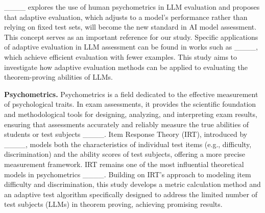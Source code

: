 ____ explores the use of human psychometrics in LLM evaluation and proposes that adaptive evaluation, which adjusts to a model’s performance rather than relying on fixed test sets, will become the new standard in AI model assessment. This concept serves as an important reference for our study. Specific applications of adaptive evaluation in LLM assessment can be found in works such as ____, which achieve efficient evaluation with fewer examples. This study aims to investigate how adaptive evaluation methods can be applied to evaluating the theorem-proving abilities of LLMs.

\textbf{Psychometrics.} Psychometrics is a field dedicated to the effective measurement of psychological traits. In exam assessments, it provides the scientific foundation and methodological tools for designing, analyzing, and interpreting exam results, ensuring that assessments accurately and reliably measure the true abilities of students or test subjects ____. Item Response Theory (IRT), introduced by ____, models both the characteristics of individual test items (e.g., difficulty, discrimination) and the ability scores of test subjects, offering a more precise measurement framework. IRT remains one of the most influential theoretical models in psychometrics ____. Building on IRT’s approach to modeling item difficulty and discrimination, this study develops a metric calculation method and an adaptive test algorithm specifically designed to address the limited number of test subjects (LLMs) in theorem proving, achieving promising results.